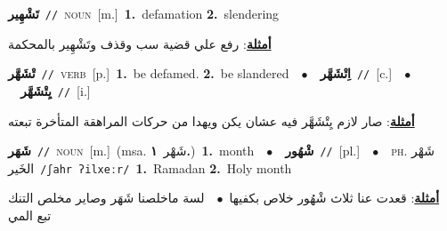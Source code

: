 \documentclass[10pt,a4paper,twoside]{article} %
\begin{document}
\begin{multicols}{2}
{\setlength\topsep{0pt}\textbf{\foreignlanguage{arabic}{تَشْهِير}}\ {\color{gray}\texttt{//}\color{black}}\ \textsc{noun}\ [m.]\ \textbf{1.}~defamation  \textbf{2.}~slendering\  \begin{flushright}\color{gray}\foreignlanguage{arabic}{\textbf{\underline{\foreignlanguage{arabic}{أمثلة}}}: رفع علي قضية سب وقذف وتَشْهِير بالمحكمة}\end{flushright}\color{black}} \vspace{2mm}

{\setlength\topsep{0pt}\textbf{\foreignlanguage{arabic}{تْشَهَّر}}\ {\color{gray}\texttt{//}\color{black}}\ \textsc{verb}\ [p.]\ \textbf{1.}~be defamed.  \textbf{2.}~be slandered\ \ $\bullet$\ \ \setlength\topsep{0pt}\textbf{\foreignlanguage{arabic}{اِتْشَهَّر}}\ {\color{gray}\texttt{//}\color{black}}\ [c.]\ \ $\bullet$\ \ \setlength\topsep{0pt}\textbf{\foreignlanguage{arabic}{يِتْشَهَّر}}\ {\color{gray}\texttt{//}\color{black}}\ [i.]\  \begin{flushright}\color{gray}\foreignlanguage{arabic}{\textbf{\underline{\foreignlanguage{arabic}{أمثلة}}}: صار لازم يِتْشَهَّر فيه عشان يكن ويهدا من حركات المراهقة المتأخرة تبعته}\end{flushright}\color{black}} \vspace{2mm}

{\setlength\topsep{0pt}\textbf{\foreignlanguage{arabic}{شَهَر}}\ {\color{gray}\texttt{//}\color{black}}\ \textsc{noun}\ [m.]\ \color{gray}(msa. \foreignlanguage{arabic}{شَهْر}~\foreignlanguage{arabic}{\textbf{١.}})\color{black}\ \textbf{1.}~month\ \ $\bullet$\ \ \setlength\topsep{0pt}\textbf{\foreignlanguage{arabic}{شْهُور}}\ {\color{gray}\texttt{//}\color{black}}\ [pl.]\ \ $\bullet$\ \ \textsc{ph.} \color{gray} \foreignlanguage{arabic}{شَهْر الخَير}\color{black}\ {\color{gray}\texttt{/{\sffamily ʃahr ʔilxeːr}/}\color{black}}\ \textbf{1.}~Ramadan  \textbf{2.}~Holy month\  \begin{flushright}\color{gray}\foreignlanguage{arabic}{\textbf{\underline{\foreignlanguage{arabic}{أمثلة}}}: قعدت عنا ثلاث شْهُور خلاص بكفيها\ $\bullet$\ \  لسة ماخلصنا شَهَر وصاير مخلص التنك تبع المي}\end{flushright}\color{black}} \vspace{2mm}


\end{multicols}
\end{document}
